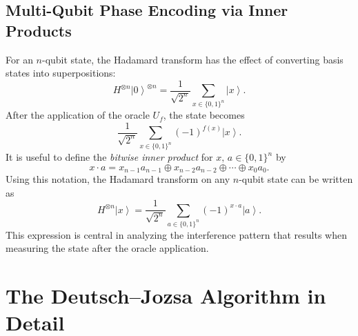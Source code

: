 \documentclass[11pt,oneside]{book}
\theoremstyle{remark}
\renewcommand{\ket}[1]{\left|#1\right\rangle}      %
\begin{document}
	\section{Multi-Qubit Phase Encoding via Inner Products}
	
	For an \( n \)-qubit state, the Hadamard transform has the effect of converting basis states into superpositions:
	\[
	H^{\otimes n} \ket{0}^{\otimes n} = \frac{1}{\sqrt{2^n}} \sum_{x \in \{0,1\}^n} \ket{x}.
	\]
	After the application of the oracle \( U_f \), the state becomes
	\[
	\frac{1}{\sqrt{2^n}} \sum_{x \in \{0,1\}^n} (-1)^{f(x)} \ket{x}.
	\]
	It is useful to define the \emph{bitwise inner product} for \( x,\,a \in \{0,1\}^n \) by
	\[
	x \cdot a = x_{n-1}a_{n-1} \oplus x_{n-2}a_{n-2} \oplus \cdots \oplus x_0 a_0.
	\]
	Using this notation, the Hadamard transform on any \( n \)-qubit state can be written as
	\[
	H^{\otimes n} \ket{x} = \frac{1}{\sqrt{2^n}} \sum_{a \in \{0,1\}^n} (-1)^{x \cdot a} \ket{a}.
	\]
	This expression is central in analyzing the interference pattern that results when measuring the state after the oracle application.
	
	\chapter{The Deutsch--Jozsa Algorithm in Detail}
	
\end{document}
